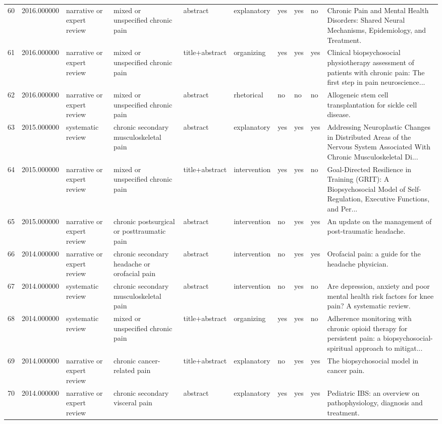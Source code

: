 \begin{longtable}{p{0.7cm}p{0.7cm}p{1.2cm}p{1.9cm}p{1.3cm}p{1.5cm}p{0.55cm}p{0.55cm}p{0.55cm}p{3.2cm}}
60 & 2016.000000 & narrative or expert review & mixed or unspecified chronic pain & abstract & explanatory & yes & yes & no & Chronic Pain and Mental Health Disorders: Shared Neural Mechanisms, Epidemiology, and Treatment. \\
61 & 2016.000000 & narrative or expert review & mixed or unspecified chronic pain & title+abstract & organizing & yes & yes & yes & Clinical biopsychosocial physiotherapy assessment of patients with chronic pain: The first step in pain neuroscience... \\
62 & 2016.000000 & narrative or expert review & mixed or unspecified chronic pain & abstract & rhetorical & no & no & no & Allogeneic stem cell transplantation for sickle cell disease. \\
63 & 2015.000000 & systematic review & chronic secondary musculoskeletal pain & abstract & explanatory & yes & yes & yes & Addressing Neuroplastic Changes in Distributed Areas of the Nervous System Associated With Chronic Musculoskeletal Di... \\
64 & 2015.000000 & narrative or expert review & mixed or unspecified chronic pain & title+abstract & intervention & yes & yes & no & Goal-Directed Resilience in Training (GRIT): A Biopsychosocial Model of Self-Regulation, Executive Functions, and Per... \\
65 & 2015.000000 & narrative or expert review & chronic postsurgical or posttraumatic pain & abstract & intervention & no & yes & yes & An update on the management of post-traumatic headache. \\
66 & 2014.000000 & narrative or expert review & chronic secondary headache or orofacial pain & abstract & intervention & no & yes & yes & Orofacial pain: a guide for the headache physician. \\
67 & 2014.000000 & systematic review & chronic secondary musculoskeletal pain & abstract & intervention & no & yes & no & Are depression, anxiety and poor mental health risk factors for knee pain? A systematic review. \\
68 & 2014.000000 & systematic review & mixed or unspecified chronic pain & title+abstract & organizing & yes & yes & no & Adherence monitoring with chronic opioid therapy for persistent pain: a biopsychosocial-spiritual approach to mitigat... \\
69 & 2014.000000 & narrative or expert review & chronic cancer-related pain & title+abstract & explanatory & no & yes & yes & The biopsychosocial model in cancer pain. \\
70 & 2014.000000 & narrative or expert review & chronic secondary visceral pain & abstract & explanatory & yes & yes & yes & Pediatric IBS: an overview on pathophysiology, diagnosis and treatment. \\

\end{longtable}
